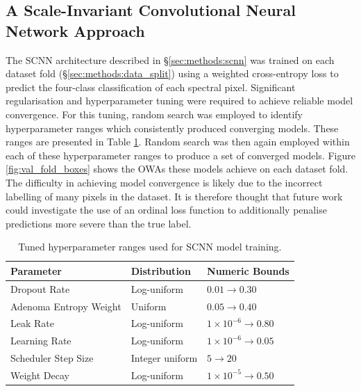 





\subsection{A Scale-Invariant Convolutional Neural Network Approach}

The SCNN architecture described in §\ref{sec:methods:scnn} was trained on each dataset fold (§\ref{sec:methods:data_split}) using a weighted cross-entropy loss to predict the four-class classification of each spectral pixel. Significant regularisation and hyperparameter tuning were required to achieve reliable model convergence. For this tuning, random search was employed to identify hyperparameter ranges which consistently produced converging models. These ranges are presented in Table \ref{tab:scnn_class_hyper_ranges}. Random search was then again employed within each of these hyperparameter ranges to produce a set of converged models. Figure \ref{fig:val_fold_boxes} shows the OWAs these models achieve on each dataset fold. The difficulty in achieving model convergence is likely due to the incorrect labelling of many pixels in the dataset. It is therefore thought that future work could investigate the use of an ordinal loss function \cite{castagnos_simple_2022,polat_class_2025} to additionally penalise predictions more severe than the true label.

\begin{table}[htbp]
    \centering
    \begin{tabular}{l l l}
    \hline
    Parameter & Distribution & Numeric Bounds \\
    \hline
    Dropout Rate        & Log-uniform         & $0.01 \rightarrow 0.30$   \\
    Adenoma Entropy Weight    & Uniform              & $0.05 \rightarrow 0.40$   \\
    Leak Rate            & Log-uniform         & $1\times 10^{-6} \rightarrow 0.80$ \\
    Learning Rate       & Log-uniform         & $1\times 10^{-6} \rightarrow 0.05$ \\
    Scheduler Step Size & Integer uniform     & $5 \rightarrow 20$        \\
    Weight Decay        & Log-uniform         & $1\times 10^{-5} \rightarrow 0.50$ \\
    \hline
    \end{tabular}
    \caption{Tuned hyperparameter ranges used for SCNN model training.} 
    \label{tab:scnn_class_hyper_ranges}
\end{table}

